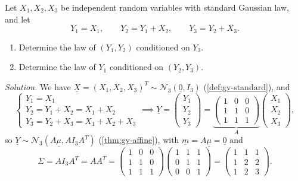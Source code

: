 \begin{example}\label{exa:gc-partial-sums}
Let $X_1,X_2,X_3$ be independent random variables with standard Gaussian law, and let
\[
  Y_1=X_1,\qquad Y_2=Y_1+X_2,\qquad Y_3=Y_2+X_3 .
\]
\begin{enumerate}[label=\alph*)]
  \item Determine the law of $(Y_1,Y_2)$ conditioned on $Y_3$.
  \item Determine the law of $Y_1$ conditioned on $(Y_2,Y_3)$.
\end{enumerate}

\emph{Solution.} We have $\underline X=(X_1,X_2,X_3)^T\sim\mathcal N_3(\underline 0,I_3)$ (\cref{def:gv-standard}), and
\[
\begin{cases}
  Y_1=X_1\\
  Y_2=Y_1+X_2=X_1+X_2\\
  Y_3=Y_2+X_3=X_1+X_2+X_3
\end{cases}
\implies
\underline Y=\begin{pmatrix}Y_1\\Y_2\\Y_3\end{pmatrix}=\underbrace{\begin{pmatrix}1&0&0\\1&1&0\\1&1&1\end{pmatrix}}_{A}\begin{pmatrix}X_1\\X_2\\X_3\end{pmatrix},
\]
so $\underline Y\sim\mathcal N_3(A\underline\mu,AI_3A^T)$ (\cref{thm:gv-affine}), with $\underline m=A\underline\mu=\underline 0$ and
\[
  \Sigma=AI_3A^T=AA^T=\begin{pmatrix}1&0&0\\1&1&0\\1&1&1\end{pmatrix}\begin{pmatrix}1&1&1\\0&1&1\\0&0&1\end{pmatrix}
  =\begin{pmatrix}1&1&1\\1&2&2\\1&2&3\end{pmatrix}.
\]


\end{example}
